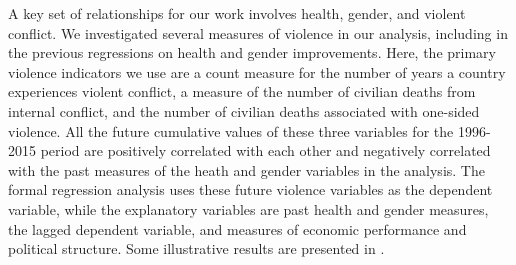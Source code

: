 \documentclass[12pt]{article}
\begin{document}
A key set of relationships for our work involves health, gender, and violent conflict. We investigated several measures of violence in our analysis, including in the previous regressions on health and gender improvements. Here, the primary violence indicators we use are a count measure for the number of years a country experiences violent conflict, a measure of the number of civilian deaths from internal conflict, and the number of civilian deaths associated with one-sided violence. All the future cumulative values of these three variables for the 1996-2015 period are positively correlated with each other and negatively correlated with the past measures of the heath and gender variables in the analysis. The formal regression analysis uses these future violence variables as the dependent variable, while the explanatory variables are past health and gender measures, the lagged dependent variable, and measures of economic performance and political structure. Some illustrative results are presented in .

\end{document}
